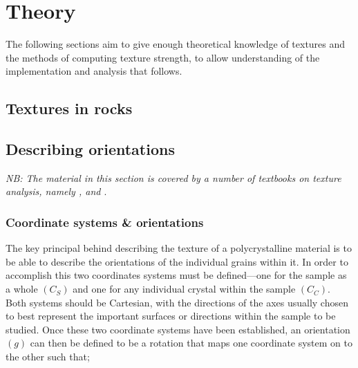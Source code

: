 \documentclass[a4paper,12pt]{report}
\numberwithin{equation}{chapter}
\begin{document}
\chapter{Theory} \label{chap:theory}
\vspace{-1cm}
The following sections aim to give enough theoretical knowledge of textures and the methods of computing texture strength, to allow understanding of the implementation and analysis that follows.


\section{Textures in rocks} 

\section{Describing orientations} \label{sec:orientations}
\emph{NB: The material in this section is covered by a number of textbooks on texture analysis, namely \cite{bunge1982texture}, \cite{Bunge1985} and \cite{Randle2000}}.




\subsection{Coordinate systems \& orientations} \label{subsec:coordinates}
The key principal behind describing the texture of a polycrystalline material is to be able to describe the orientations of the individual grains within it. In order to accomplish this two coordinates systems must be defined---one for the sample as a whole $(C_S)$ and one for any individual crystal within the sample $(C_C)$. Both systems should be Cartesian, with the directions of the axes usually chosen to best represent the important surfaces or directions within the sample to be studied. Once these two coordinate systems have been established, an orientation $(g)$ can then be defined to be a rotation that maps one coordinate system on to the other such that;
\end{document}
